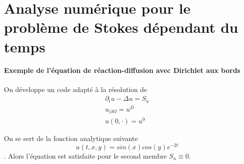 \section{Analyse numérique pour le problème de Stokes dépendant du temps}

\paragraph{Exemple de l'équation de réaction-diffusion avec Dirichlet aux bords} On développe un code adapté à la résolution de
\begin{align*}
    \partial_t u - \Delta u = S_u \\
    u_{|\partial \Omega} = u^D \\
    u(0, \cdot) = u^0
\end{align*}

On se sert de la fonction analytique suivante $$ u(t, x, y) = sin(x) cos(y) e^{-2t} $$. Alors l'équation est satisfaite pour le second membre $S_u \equiv 0$. 

